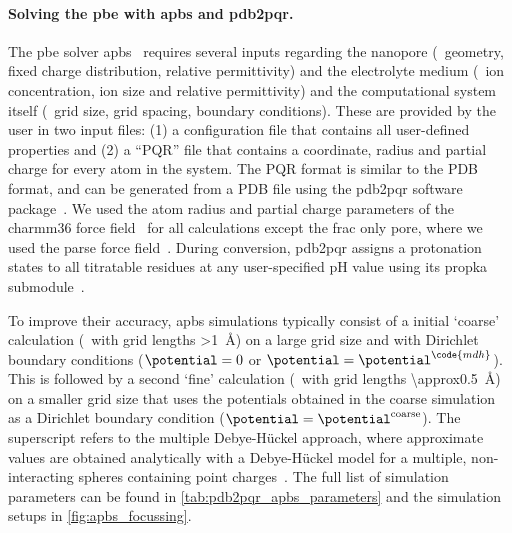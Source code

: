 \paragraph{Solving the \gls{pbe} with \gls{apbs} and \gls{pdb2pqr}.}
%
The \gls{pbe} solver \gls{apbs}~\cite{Jurrus-2018,Baker-2001} requires several inputs regarding the nanopore
(\ie~geometry, fixed charge distribution, relative permittivity) and the electrolyte medium (\ie~ion
concentration, ion size and relative permittivity) and the computational system itself (\ie~grid size, grid
spacing, boundary conditions). These are provided by the user in two input files: (1) a configuration file
that contains all user-defined properties and (2) a ``PQR'' file that contains a coordinate, radius and
partial charge for every atom in the system. The PQR format is similar to the PDB format, and can be generated
from a PDB file using the \gls{pdb2pqr} software package~\cite{Jurrus-2018,Dolinsky-2004,Dolinsky-2007}. We
used the atom radius and partial charge parameters of the \gls{charmm36} force field~\cite{Huang-2013} for all
calculations except the \gls{frac} only pore, where we used the \gls{parse} force
field~\cite{Sitkoff-1994,Sitkoff-1996}. During conversion, \gls{pdb2pqr} assigns a protonation states to all
titratable residues at any user-specified pH value using its \gls{propka} submodule~\cite{Li-2005}.

To improve their accuracy, \gls{apbs} simulations typically consist of a initial `coarse' calculation
(\ie~with grid lengths \SI{>1}{\angstrom}) on a large grid size and with Dirichlet boundary conditions
($\potential = 0$ or $\potential = \potential^{\code{mdh}}$). This is followed by a second `fine' calculation
(\ie~with grid lengths \SI{\approx0.5}{\angstrom}) on a smaller grid size that uses the potentials obtained in
the coarse simulation as a Dirichlet boundary condition ($\potential = \potential^{\mathrm{coarse}}$). The
 superscript refers to the multiple Debye-H\"{u}ckel approach, where approximate values are obtained
analytically with a Debye-H\"{u}ckel model for a multiple, non-interacting spheres containing point
charges~\cite{Baker-2001,Baker-2005,Stone-2010}. The full list of simulation parameters can be found in
\cref{tab:pdb2pqr_apbs_parameters} and the simulation setups in \cref{fig:apbs_focussing}.


